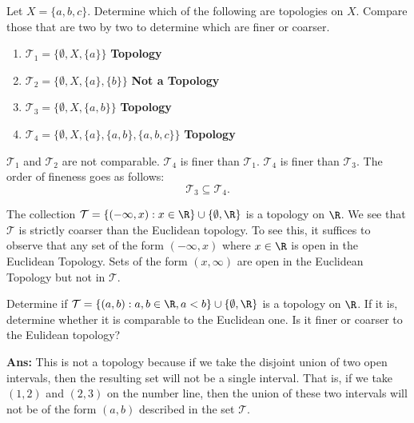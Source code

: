 \begin{problem}
    Let \( X = \{ a,b,c  \}  \). Determine which of the following are topologies on \( X  \). Compare those that are two by two to determine which are finer or coarser.
\end{problem}

\begin{enumerate}
    \item[(a)] \( {\mathcal{T}}_{1} = \{  \emptyset ,  X , \{ a  \}  \}  \) \textbf{Topology}
    \item[(b)] \( {\mathcal{T}}_{2} = \{  \emptyset ,  X , \{ a  \}, \{ b \}   \}  \) \textbf{Not a Topology}
    \item[(c)] \( {\mathcal{T}}_{3} = \{  \emptyset ,  X , \{ a , b  \}   \}  \) \textbf{Topology}
    \item[(d)] \( {\mathcal{T}}_{4} = \{  \emptyset ,  X , \{ a  \}, \{ a,b \} , \{ a,b,c \}   \}  \) \textbf{Topology}
\end{enumerate}
\( {\mathcal{T}}_{1} \) and \( {\mathcal{T}}_{2} \) are not comparable. \( \mathcal{T}_4  \) is finer than \( \mathcal{T}_1  \). \( \mathcal{T}_4 \) is finer than \( \mathcal{T}_3 \).
The order of fineness goes as follows:
\[   {\mathcal{T}}_{3} \subseteq {\mathcal{T}}_{4}. \]
\begin{eg}
    The collection \( \mathcal{T} = \{  (-\infty , x ) : x \in \R  \} \cup \{ \emptyset, \R  \}  \) is a topology on \( \R  \). We see that \( \mathcal{T} \) is strictly coarser than the Euclidean topology. To see this, it suffices to observe that any set of the form \( (-\infty , x ) \) where \( x \in \R  \) is open in the Euclidean Topology. Sets of the form \( (x,\infty )  \) are open in the Euclidean Topology but not in \( \mathcal{T} \).
\end{eg}

\begin{eg}
   Determine if \( \mathcal{T} = \{  (a,b) : a,b \in \R , a < b  \} \cup \{ \emptyset , \R  \}  \) is a topology on \( \R  \). If it is, determine whether it is comparable to the Euclidean one. Is it finer or coarser to the Eulidean topology? 

   \textbf{Ans:} This is not a topology because if we take the disjoint union of two open intervals, then the resulting set will not be a single interval. That is, if we take \( (1,2)  \) and \( (2,3) \) on the number line, then the union of these two intervals will not be of the form \( (a,b) \) described in the set \( \mathcal{T} \).
\end{eg}

